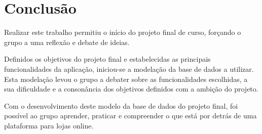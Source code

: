 \section{Conclusão} \label{section: Conclusao}
Realizar este trabalho permitiu o início do projeto final de curso, forçando o grupo a uma reflexão e debate de ideias.
\par \vspace{6pt}
Definidos os objetivos do projeto final e estabelecidas as principais funcionalidades da aplicação, iniciou-se a modelação da base de dados a utilizar. Esta modelação levou o grupo a debater sobre as funcionalidades escolhidas, a sua dificuldade e a consonância dos objetivos definidos com a ambição do projeto.
\par \vspace{6pt}
Com o desenvolvimento deste modelo da base de dados do projeto final, foi possível ao grupo aprender, praticar e compreender o que está por detrás de uma plataforma para lojas online.